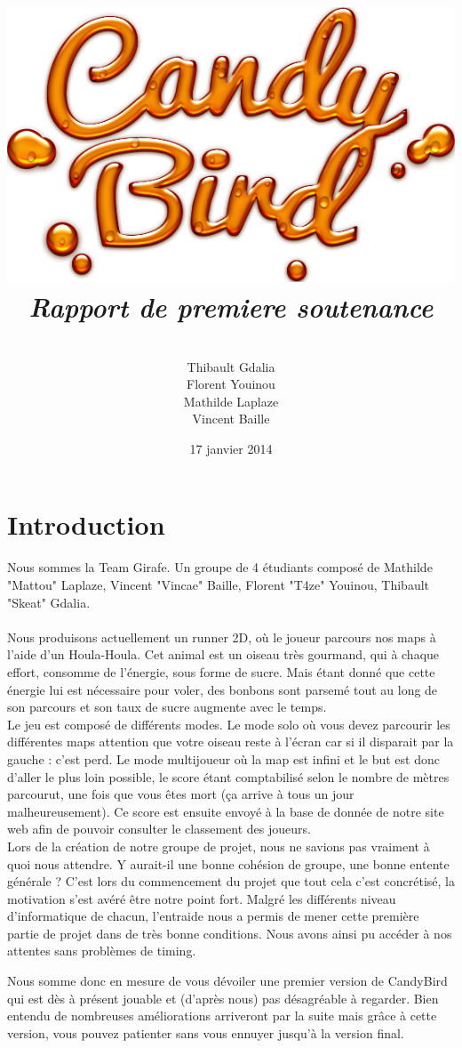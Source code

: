 \documentclass [11pt]{report}
\title{
	\includegraphics[scale=0.43]{images/Logojeu.png}
	 \\\vspace{20mm}
	\textbf{\Huge \itshape Rapport de premiere soutenance  }
	}
\author{ \\\vspace{2mm}
	Thibault Gdalia\\\vspace{2mm}
	Florent Youinou\\\vspace{2mm}
	Mathilde Laplaze\\\vspace{2mm}
	Vincent Baille \\\vspace{30mm}
	}
\date{17 janvier 2014}
\begin{document}
\thispagestyle{fancy}
\renewcommand{\baselinestretch}{0.001}
\maketitle
\tableofcontents

\newpage



\chapter*{Introduction}

\indent Nous sommes la Team Girafe. Un groupe de 4 étudiants composé de Mathilde "Mattou" Laplaze, Vincent "Vincae" Baille, Florent "T4ze" Youinou, Thibault "Skeat" Gdalia. \\\\
\indent Nous produisons actuellement un runner 2D, où le joueur parcours nos maps à l'aide d'un Houla-Houla. Cet animal est un oiseau très gourmand, qui à chaque effort, consomme de l'énergie, sous forme de sucre. Mais étant donné que cette énergie lui est nécessaire pour voler, des bonbons sont parsemé tout au long de son parcours et son taux de sucre augmente avec le temps.\\
\indent Le jeu est composé de différents modes. Le mode solo où vous devez parcourir les différentes maps attention que votre oiseau reste à l'écran car si il disparait par la gauche : c'est perd. Le mode multijoueur où la map est infini et le but est donc d'aller le plus loin possible, le score étant comptabilisé selon le nombre de mètres parcourut, une fois que vous êtes mort (ça arrive à tous un jour malheureusement). Ce score est ensuite envoyé à la base de donnée de notre site web afin de pouvoir consulter le classement des joueurs.\\

Lors de la création de notre groupe de projet, nous ne savions pas vraiment à quoi nous attendre. Y aurait-il une bonne cohésion de groupe, une bonne entente générale ? C'est lors du commencement du projet que tout cela c'est concrétisé, la motivation s'est avéré être notre point fort. Malgré les différents niveau d'informatique de chacun, l'entraide nous a permis de mener cette première partie de projet dans de très bonne conditions. Nous avons ainsi pu accéder à nos attentes sans problèmes de timing.

Nous somme donc en mesure de vous dévoiler une premier version de CandyBird qui est dès à présent jouable et (d'après nous) pas désagréable à regarder. Bien entendu de nombreuses améliorations arriveront par la suite mais grâce à cette version, vous pouvez patienter sans vous ennuyer jusqu'à la version final.\\
\end{document}
